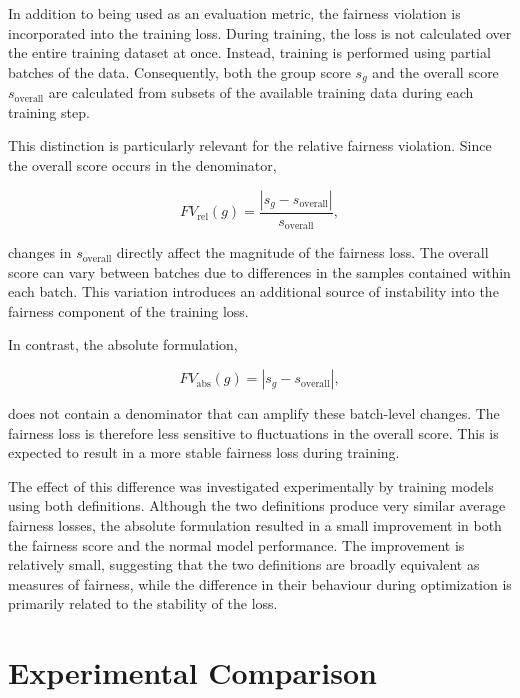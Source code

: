 In addition to being used as an evaluation metric, the fairness violation is incorporated into the training loss. During training, the loss is not calculated over the entire training dataset at once. Instead, training is performed using partial batches of the data. Consequently, both the group score $s_g$ and the overall score $s_{\mathrm{overall}}$ are calculated from subsets of the available training data during each training step.

This distinction is particularly relevant for the relative fairness violation. Since the overall score occurs in the denominator,

\begin{equation}
FV_{\mathrm{rel}}(g)
=
\frac{
\left|s_g-s_{\mathrm{overall}}\right|
}{
s_{\mathrm{overall}}
},
\end{equation}

changes in $s_{\mathrm{overall}}$ directly affect the magnitude of the fairness loss. The overall score can vary between batches due to differences in the samples contained within each batch. This variation introduces an additional source of instability into the fairness component of the training loss.

In contrast, the absolute formulation,

\begin{equation}
FV_{\mathrm{abs}}(g)
=
\left|s_g-s_{\mathrm{overall}}\right|,
\end{equation}

does not contain a denominator that can amplify these batch-level changes. The fairness loss is therefore less sensitive to fluctuations in the overall score. This is expected to result in a more stable fairness loss during training.

The effect of this difference was investigated experimentally by training models using both definitions. Although the two definitions produce very similar average fairness losses, the absolute formulation resulted in a small improvement in both the fairness score and the normal model performance. The improvement is relatively small, suggesting that the two definitions are broadly equivalent as measures of fairness, while the difference in their behaviour during optimization is primarily related to the stability of the loss.

\section{Experimental Comparison}

